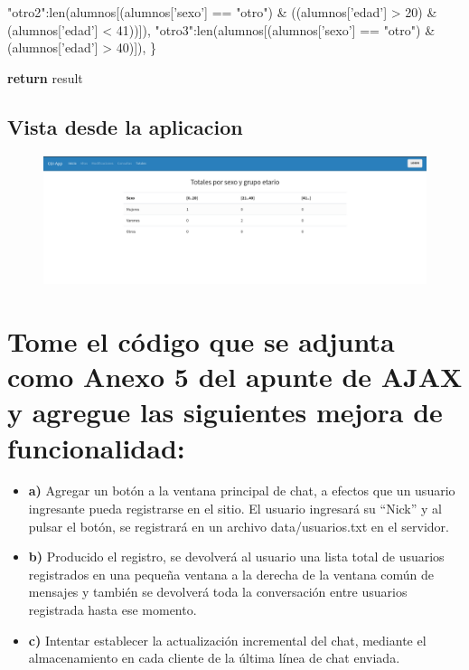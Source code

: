 \documentclass[12pt]{extarticle}
\makeatletter
\def\maxwidth{\ifdim\Gin@nat@width>\linewidth\linewidth
    \else\Gin@nat@width\fi}
\let\Oldincludegraphics\includegraphics
\renewcommand{\includegraphics}[1]{\Oldincludegraphics[width=.8\maxwidth]{#1}}
\newenvironment{Shaded}{}{}
\newcommand{\DecValTok}[1]{\textcolor[rgb]{0.25,0.63,0.44}{{#1}}}
\newcommand{\StringTok}[1]{\textcolor[rgb]{0.25,0.44,0.63}{{#1}}}
\newcommand{\NormalTok}[1]{{#1}}
\newcommand{\ControlFlowTok}[1]{\textcolor[rgb]{0.00,0.44,0.13}{\textbf{{#1}}}}
\newcommand{\OperatorTok}[1]{\textcolor[rgb]{0.40,0.40,0.40}{{#1}}}
\newcommand{\BuiltInTok}[1]{{#1}}
\makeatother
\begin{document}
\begin{Shaded}
\begin{Highlighting}[]
            \StringTok{"otro2"}\NormalTok{:}\BuiltInTok{len}\NormalTok{(alumnos[(alumnos[}\StringTok{'sexo'}\NormalTok{] }\OperatorTok{==} \StringTok{"otro"}\NormalTok{) }\OperatorTok{&}\NormalTok{ ((alumnos[}\StringTok{'edad'}\NormalTok{] }\OperatorTok{>} \DecValTok{20}\NormalTok{) }\OperatorTok{&}\NormalTok{ (alumnos[}\StringTok{'edad'}\NormalTok{] }\OperatorTok{<} \DecValTok{41}\NormalTok{))]),}
            \StringTok{"otro3"}\NormalTok{:}\BuiltInTok{len}\NormalTok{(alumnos[(alumnos[}\StringTok{'sexo'}\NormalTok{] }\OperatorTok{==} \StringTok{"otro"}\NormalTok{) }\OperatorTok{&}\NormalTok{ (alumnos[}\StringTok{'edad'}\NormalTok{] }\OperatorTok{>} \DecValTok{40}\NormalTok{)]),}
\NormalTok{        \}}

        \ControlFlowTok{return}\NormalTok{ result}
\end{Highlighting}
\end{Shaded}

\subsection{Vista desde la aplicacion}\label{vista-desde-la-aplicacion}

\begin{figure}[h]
\centering
\includegraphics{images/totales.png}
\caption{}
\end{figure}

\newpage

    \section{Tome el código que se adjunta como Anexo 5 del apunte de AJAX y
agregue las siguientes mejora de
funcionalidad:}\label{tome-el-cuxf3digo-que-se-adjunta-como-anexo-5-del-apunte-de-ajax-y-agregue-las-siguientes-mejora-de-funcionalidad}

\begin{itemize}
\item
  \textbf{a)} Agregar un botón a la ventana principal de chat, a efectos
  que un usuario ingresante pueda registrarse en el sitio. El usuario
  ingresará su ``Nick'' y al pulsar el botón, se registrará en un
  archivo data/usuarios.txt en el servidor.
\item
  \textbf{b)} Producido el registro, se devolverá al usuario una lista
  total de usuarios registrados en una pequeña ventana a la derecha de
  la ventana común de mensajes y también se devolverá toda la
  conversación entre usuarios registrada hasta ese momento.
\item
  \textbf{c)} Intentar establecer la actualización incremental del chat,
  mediante el almacenamiento en cada cliente de la última línea de chat
  enviada.
\end{itemize}
\end{document}
